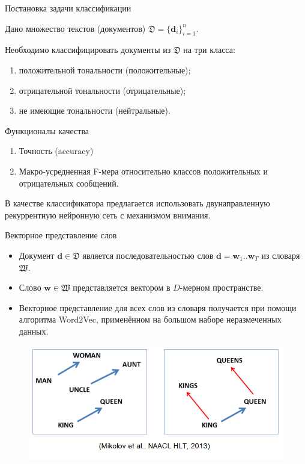 \documentclass{beamer}
\begin{document}
\begin{frame}{Постановка задачи классификации}
	\begin{block}{}
        Дано множество текстов (документов) $\mathfrak{D} = \{\mathbf{d}_i\}_{i=1}^{n}$.
	\end{block}    
    
    \begin{block}{}
        Необходимо классифицировать документы из $\mathfrak{D}$ на три класса:
        	\begin{enumerate}
			\item положительной тональности (положительные);
			\item отрицательной тональности (отрицательные);
			\item не имеющие тональности (нейтральные).
			\end{enumerate}
	\end{block}
	
	\begin{block}{Функционалы качества}
		\begin{enumerate}
			\item Точность (accuracy)
			\item Макро-усредненная F-мера
			относительно классов положительных и
			отрицательных сообщений.
		\end{enumerate}
	\end{block}
	В качестве классификатора предлагается использовать двунаправленную рекуррентную нейронную сеть с механизмом внимания.
\end{frame}
\begin{frame}{Векторное представление слов}
	\begin{itemize}
	\item Документ $\mathbf{d}\in\mathfrak{D}$ является последовательностью слов $\mathbf{d}=\mathbf{w}_1..\mathbf{w}_T$ из словаря $\mathfrak{W}$.\\
	\item Слово $\mathbf{w}\in\mathfrak{W}$ представляется вектором в $D$-мерном пространстве.\\
	\item Векторное представление для всех слов из словаря получается при помощи алгоритма Word2Vec, применённом на большом наборе неразмеченных данных.
	\end{itemize}
\begin{figure}[!h]
  \includegraphics[width=1.0\textwidth]{images/word2vec.png}
\end{figure}
\end{frame}
\end{document}
